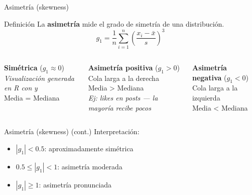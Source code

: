 \documentclass[aspectratio=169, 11pt]{beamer}
\begin{document}
\begin{frame}{Asimetr\'ia (skewness)}
\begin{block}{Definici\'on}
La \textbf{asimetr\'ia} mide el grado de simetr\'ia de una distribuci\'on.
\[
g_1 = \frac{1}{n} \sum_{i=1}^n \left(\frac{x_i - \bar{x}}{s}\right)^3
\]
\end{block}

\begin{columns}[T]
\textbf{Sim\'etrica} ($g_1 \approx 0$)\\
\textit{Visualizaci\'on generada en R con}  \textit{y} \\
Media = Mediana

\textbf{Asimetr\'ia positiva} ($g_1 > 0$)\\
Cola larga a la derecha\\
Media > Mediana\\
\textit{Ej: likes en posts --- la mayor\'ia recibe pocos}

\textbf{Asimetr\'ia negativa} ($g_1 < 0$)\\
Cola larga a la izquierda\\
Media < Mediana
\end{columns}
\end{frame}

\begin{frame}{Asimetr\'ia (skewness) (cont.)}
\alert{Interpretaci\'on}:
\begin{itemize}
\item $|g_1| < 0.5$: aproximadamente sim\'etrica
\item $0.5 \leq |g_1| < 1$: asimetr\'ia moderada
\item $|g_1| \geq 1$: asimetr\'ia pronunciada
\end{itemize}
\end{frame}
\end{document}
